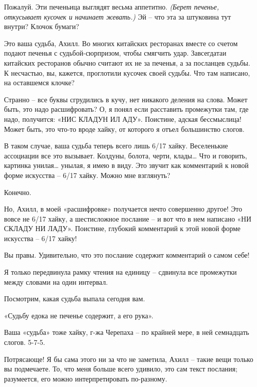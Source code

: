 \documentclass[../main.tex]{subfiles}
\begin{document}
\begin{dialogue}
 Пожалуй. Эти печеньица выглядят весьма аппетитно. \emph{(Берет печенье, откусывает кусочек и начинает жевать.)} Эй \--- что эта за штуковина тут внутри? Клочок бумаги?

 Это ваша судьба, Ахилл. Во многих китайских ресторанах вместе со счетом подают печенья с судьбой-сюрпризом, чтобы смягчить удар. Завсегдатаи китайских ресторанов обычно считают их не за печенья, а за посланцев судьбы. К несчастью, вы, кажется, проглотили кусочек своей судьбы. Что там написано, на оставшемся клочке?

 Странно \--- все буквы сгрудились в кучу, нет никакого деления на слова. Может быть, это надо расшифровать? О, я понял если расставить промежутки там, где надо, получится: «НИС КЛАДУН ИЛ АДУ». Поистине, адская бессмыслица! Может быть, это что-то вроде хайку, от которого я отъел большинство слогов.

 В таком случае, ваша судьба теперь всего лишь 6/17 хайку. Веселенькие ассоциации все это вызывает. Колдуны, болота, черти, клады\ldots{} Что и говорить, картинка унилая\ldots{} унылая, я имею в виду. Это звучит как комментарий к новой форме искусства \--- 6/17 хайку. Можно мне взглянуть?

 Конечно.

 Но, Ахилл, в моей «расшифровке» получается нечто совершенно другое! Это вовсе не 6/17 хайку, а шестисложное послание \--- и вот что в нем написано «НИ СКЛАДУ НИ ЛАДУ». Поистине, глубокий комментарий к этой новой форме искусства \--- 6/17 хайку!

 Вы правы. Удивительно, что это послание содержит комментарий о самом себе!

 Я только передвинула рамку чтения на единицу \--- сдвинула все промежутки между словами на один интервал.

 Посмотрим, какая судьба выпала сегодня вам.

 «Судьбу едока не печенье содержит, а его рука».

 Ваша «судьба» тоже хайку, г-жа Черепаха \--- по крайней мере, в ней семнадцать слогов. 5-7-5.

 Потрясающе! Я бы сама этого ни за что не заметила, Ахилл \--- такие вещи только вы подмечаете. То, что меня больше всего удивило, это сам текст послания; разумеется, его можно интерпретировать по-разному.


\end{dialogue}
\end{document}
